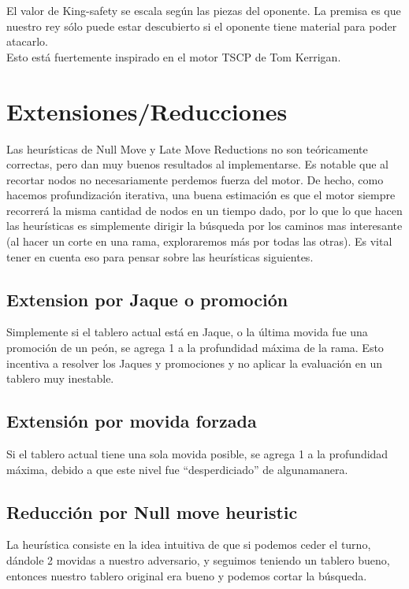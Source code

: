 \documentclass{article}
\begin{document}
El valor de King-safety se escala según las piezas del oponente. La
premisa es que nuestro rey sólo puede estar descubierto si el oponente
tiene material para poder atacarlo.
\\

Esto está fuertemente inspirado en el motor TSCP de Tom Kerrigan.

\section{Extensiones/Reducciones}

Las heurísticas de Null Move y Late Move Reductions no son
teóricamente correctas, pero dan muy buenos resultados al
implementarse. Es notable que al recortar nodos no necesariamente
perdemos fuerza del motor. De hecho, como hacemos profundización
iterativa, una buena estimación es que el motor siempre recorrerá
la misma cantidad de nodos en un tiempo dado, por lo que lo que hacen
las heurísticas es simplemente dirigir la búsqueda por los caminos
mas interesante (al hacer un corte en una rama, exploraremos más por
todas las otras). Es vital tener en cuenta eso para pensar sobre las
heurísticas siguientes.

\subsection{Extension por Jaque o promoción}
Simplemente si el tablero actual está en Jaque, o la última movida fue
una promoción de un peón, se agrega 1 a la profundidad máxima de la
rama. Esto incentiva a resolver los Jaques y promociones y no aplicar la
evaluación en un tablero muy inestable.

\subsection{Extensión por movida forzada}
Si el tablero actual tiene una sola movida posible, se agrega 1 a la
profundidad máxima, debido a que este nivel fue ``desperdiciado'' de
algunamanera.

\subsection{Reducción por Null move heuristic}
La heurística consiste en la idea intuitiva de que si podemos ceder el
turno, dándole 2 movidas a nuestro adversario, y seguimos teniendo un
tablero bueno, entonces nuestro tablero original era bueno y podemos
cortar la búsqueda.
\\
\end{document}
